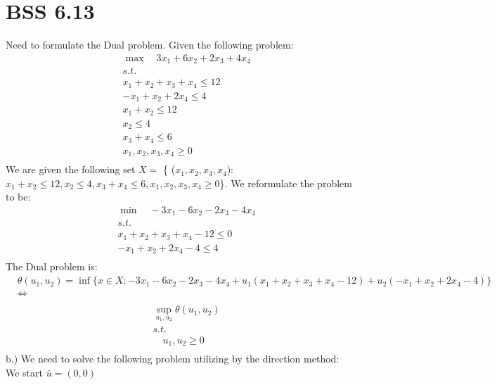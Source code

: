 \documentclass[12pt]{article}
\begin{document}
\section{BSS 6.13}
    Need to formulate the Dual problem. Given the following problem: 
        \begin{align*}
            &\max \quad 3x_1 + 6 x_2 + 2x_3 + 4x_4\\
            &s.t.\\
            &x_1 + x_2 + x_3 + x_4 \leq 12\\
            &-x_1 + x_2 + 2x_4 \leq 4\\
            &x_1 + x_2 \leq 12\\
            &x_2 \leq 4\\
            &x_3 + x_4 \leq 6\\
            &x_1, x_2, x_3, x_4 \geq 0\\
        \end{align*}
    We are given the following set $X =$ \{ ($x_1,x_2,x_3,x_4$): $x_1 + x_2 \leq 12, x_2 \leq 4, x_3 + x_4 \leq 6, x_1,x_2,x_3,x_4 \geq 0$\}. 
    We reformulate the problem to be:\\
        \begin{align*}
            &\min \quad -3x_1 - 6x_2 - 2x_3 - 4x_4\\
            &s.t.\\
            &x_1 + x_2 + x_3 +x_4 -12 \leq 0 \\
            &-x_1 + x_2 + 2x_4 - 4 \leq 4\\ 
        \end{align*}
    The Dual problem is: \\
        \begin{align*}
            &\theta(u_1,u_2) = \inf \{x \in X:  -3x_1 - 6x_2 - 2x_3 - 4x_4 + u_1(x_1 + x_2 + x_3 +x_4 -12) + u_2(-x_1 + x_2 + 2x_4 - 4) \}\\
            &\Longleftrightarrow\\
        \end{align*}
        \begin{align*}
            &\sup_{u_1, u_2}\theta(u_1,u_2)\\
            &s.t.\\
            &\quad u_1,u_2 \geq 0\\
        \end{align*}
    b.) We need to solve the following problem utilizing by the direction method:\\
    We start $\bar u = (0,0)$\\ 
\end{document}
